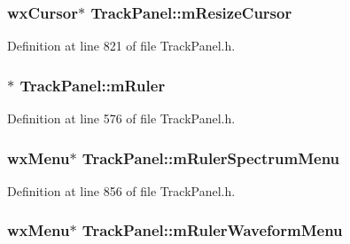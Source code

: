 \subsubsection[{\texorpdfstring{m\+Resize\+Cursor}{mResizeCursor}}]{\setlength{\rightskip}{0pt plus 5cm}wx\+Cursor$\ast$ Track\+Panel\+::m\+Resize\+Cursor\hspace{0.3cm}{\ttfamily [protected]}}\hypertarget{class_track_panel_a2a074a10dd9eddf34ddfb55956b7fca7}{}\label{class_track_panel_a2a074a10dd9eddf34ddfb55956b7fca7}


Definition at line 821 of file Track\+Panel.\+h.

\subsubsection[{\texorpdfstring{m\+Ruler}{mRuler}}]{$\ast$ Track\+Panel\+::m\+Ruler\hspace{0.3cm}{\ttfamily [protected]}}\hypertarget{class_track_panel_a0c030045e204ac35bb3066a260831ce3}{}\label{class_track_panel_a0c030045e204ac35bb3066a260831ce3}


Definition at line 576 of file Track\+Panel.\+h.

\subsubsection[{\texorpdfstring{m\+Ruler\+Spectrum\+Menu}{mRulerSpectrumMenu}}]{\setlength{\rightskip}{0pt plus 5cm}wx\+Menu$\ast$ Track\+Panel\+::m\+Ruler\+Spectrum\+Menu\hspace{0.3cm}{\ttfamily [protected]}}\hypertarget{class_track_panel_aaae33e2c9a2354384a4d70672d404074}{}\label{class_track_panel_aaae33e2c9a2354384a4d70672d404074}


Definition at line 856 of file Track\+Panel.\+h.

\subsubsection[{\texorpdfstring{m\+Ruler\+Waveform\+Menu}{mRulerWaveformMenu}}]{\setlength{\rightskip}{0pt plus 5cm}wx\+Menu$\ast$ Track\+Panel\+::m\+Ruler\+Waveform\+Menu\hspace{0.3cm}{\ttfamily [protected]}}\hypertarget{class_track_panel_a5e797a078579ae83a2953dc3cdd4e267}{}\label{class_track_panel_a5e797a078579ae83a2953dc3cdd4e267}



